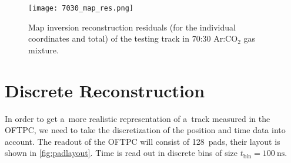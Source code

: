 			\begin{figure}
				\centering
				\texttt{[image: 7030\_map\_res.png]}
				\caption{Map inversion reconstruction residuals (for the individual coordinates and total) of the testing track in 70:30 Ar:CO$_2$ gas mixture.}
				\label{fig:7030_map_res}
			\end{figure}
			
			
		
	\section{Discrete Reconstruction}		
		In order to get a~more realistic representation of a~track measured in the \ac{OFTPC}, we need to take the discretization of the position and time data into account. The readout of the \ac{OFTPC} will consist of 128~pads, their layout is shown in \cref{fig:padlayout}. Time is read out in discrete bins of size $t_\text{bin} = \qty{100}{\ns}$.
		
